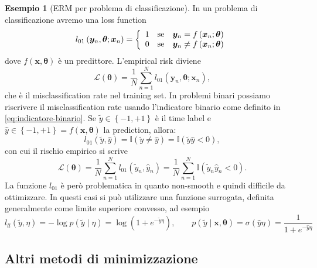 \documentclass[10pt]{article}
\newcommand{\ve}[1]{\bm{#1}}
\newcommand{\cond}{\mid}
\newcommand{\pare}[1]{
	\ensuremath{\left(#1\right)}
}
\theoremstyle{definition}
\newtheorem{example}{Esempio}[section]
\begin{document}
\begin{example}[ERM per problema di classificazione]
In un problema di classificazione avremo una loss function
\begin{equation}
l_{01}\pare{\ve{y}_n, \ve{\theta}; \ve{x}_n} = \left\{\begin{array}{l@{\quad\text{se}\quad}l}
1 & \ve{y}_n = f\pare{\ve{x}_n; \ve{\theta}} \\
0 & \ve{y}_n \neq f\pare{\ve{x}_n; \ve{\theta}} 
\end{array}\right.
\end{equation}
dove $f\pare{\ve{x}, \ve{\theta}}$ è un predittore. L'empirical risk diviene
\begin{equation}
\mathcal{L}\pare{\ve{\theta}} = \frac{1}{N}\sum_{n=1}^N l_{01}\pare{\ve{y}_n, \ve{\theta}; \ve{x}_n},
\end{equation}
che è il misclassification rate nel training set. In problemi binari possiamo
riscrivere il misclassification rate usando l'indicatore binario come definito
in \eqref{eq:indicatore-binario}. Se $\tilde{y} \in \left\{ -1, +1 \right\}$ è
il time label e $\hat{y}\in \left\{-1, +1\right\} = f\pare{\ve{x},
\ve{\theta}}$ la prediction, allora:
\begin{equation}
l_{01}\pare{\tilde{y}, \hat{y}} = \mathbb{I}\pare{\tilde{y}\neq\hat{y}} = \mathbb{I}\pare{\tilde{y}\hat{y}<0},
\end{equation}
con cui il rischio empirico si scrive
\begin{equation}
\mathcal{L}\pare{\ve{\theta}} = \frac{1}{N}\sum_{n=1}^{N}l_{01}\pare{\tilde{y}_n, \hat{y}_n} = \frac{1}{N}\sum_{n=1}^N\mathbb{I}\pare{\tilde{y}_n\hat{y}_n < 0}.
\end{equation}
La funzione $l_{01}$ è però problematica in quanto non-smooth e quindi difficile
da ottimizzare. In questi casi si può utilizzare una funzione surrogata,
definita generalmente come limite superiore convesso, ad esempio
\begin{equation}
l_{ll}\pare{\tilde{y}, \eta} = -\log{p\pare{\tilde{y}\cond\eta}} = \log\pare{1 + e^{-\tilde{y}\eta}},\qquad p\pare{\tilde{y}\cond\ve{x},\ve{\theta}} = \sigma\pare{\hat{y}\eta} = \frac{1}{1+e^{-\hat{y}\eta}}
\end{equation}
\end{example}

\subsection{Altri metodi di minimizzazione}
\end{document}
